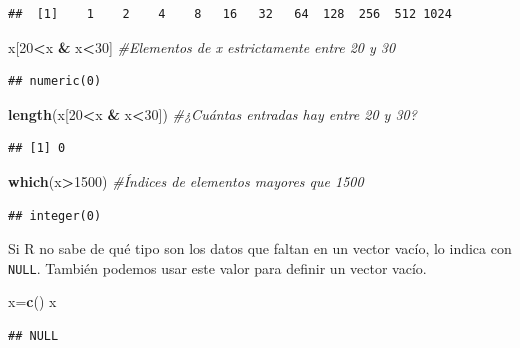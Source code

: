 \documentclass[]{book}
\newenvironment{Shaded}{\begin{snugshade}}{\end{snugshade}}
\newcommand{\CommentTok}[1]{\textcolor[rgb]{0.56,0.35,0.01}{\textit{#1}}}
\newcommand{\DecValTok}[1]{\textcolor[rgb]{0.00,0.00,0.81}{#1}}
\newcommand{\KeywordTok}[1]{\textcolor[rgb]{0.13,0.29,0.53}{\textbf{#1}}}
\newcommand{\NormalTok}[1]{#1}
\newcommand{\OperatorTok}[1]{\textcolor[rgb]{0.81,0.36,0.00}{\textbf{#1}}}
\newcommand{\StringTok}[1]{\textcolor[rgb]{0.31,0.60,0.02}{#1}}
\theoremstyle{definition}
\theoremstyle{definition}
\theoremstyle{definition}
\theoremstyle{remark}
\begin{document}
\begin{verbatim}
##  [1]    1    2    4    8   16   32   64  128  256  512 1024
\end{verbatim}

\begin{Shaded}
\begin{Highlighting}[]
\NormalTok{x[}\DecValTok{20}\OperatorTok{<}\NormalTok{x }\OperatorTok{&}\StringTok{ }\NormalTok{x}\OperatorTok{<}\DecValTok{30}\NormalTok{] }\CommentTok{#Elementos de x estrictamente entre 20 y 30}
\end{Highlighting}
\end{Shaded}

\begin{verbatim}
## numeric(0)
\end{verbatim}

\begin{Shaded}
\begin{Highlighting}[]
\KeywordTok{length}\NormalTok{(x[}\DecValTok{20}\OperatorTok{<}\NormalTok{x }\OperatorTok{&}\StringTok{ }\NormalTok{x}\OperatorTok{<}\DecValTok{30}\NormalTok{]) }\CommentTok{#¿Cuántas entradas hay entre 20 y 30?}
\end{Highlighting}
\end{Shaded}

\begin{verbatim}
## [1] 0
\end{verbatim}

\begin{Shaded}
\begin{Highlighting}[]
\KeywordTok{which}\NormalTok{(x}\OperatorTok{>}\DecValTok{1500}\NormalTok{) }\CommentTok{#Índices de elementos mayores que 1500}
\end{Highlighting}
\end{Shaded}

\begin{verbatim}
## integer(0)
\end{verbatim}

Si R no sabe de qué tipo son los datos que faltan en un vector vacío, lo indica con \texttt{NULL}. También podemos usar este valor para definir un vector vacío.

\begin{Shaded}
\begin{Highlighting}[]
\NormalTok{x=}\KeywordTok{c}\NormalTok{()}
\NormalTok{x}
\end{Highlighting}
\end{Shaded}

\begin{verbatim}
## NULL
\end{verbatim}
\end{document}
